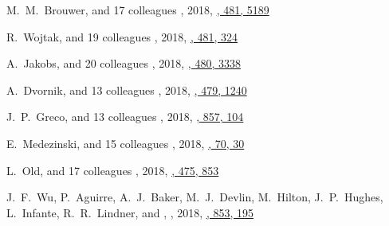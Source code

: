 \begin{etaremune}
\item
M.~M.~Brouwer, and 17 colleagues
,
2018, \href{https://ui.adsabs.harvard.edu/abs/2018MNRAS.481.5189B}{\mnras, 481, 5189}

\item
R.~Wojtak, and 19 colleagues
,
2018, \href{https://ui.adsabs.harvard.edu/abs/2018MNRAS.481..324W}{\mnras, 481, 324}

\item
A.~Jakobs, and 20 colleagues
,
2018, \href{https://ui.adsabs.harvard.edu/abs/2018MNRAS.480.3338J}{\mnras, 480, 3338}

\item
A.~Dvornik, and 13 colleagues
,
2018, \href{https://ui.adsabs.harvard.edu/abs/2018MNRAS.479.1240D}{\mnras, 479, 1240}

\item
J.~P.~Greco, and 13 colleagues
,
2018, \href{https://ui.adsabs.harvard.edu/abs/2018ApJ...857..104G}{\apj, 857, 104}

\item
E.~Medezinski, and 15 colleagues
,
2018, \href{https://ui.adsabs.harvard.edu/abs/2018PASJ...70...30M}{\pasj, 70, 30}

\item
L.~Old, and 17 colleagues
,
2018, \href{https://ui.adsabs.harvard.edu/abs/2018MNRAS.475..853O}{\mnras, 475, 853}

\item
J.~F.~Wu, P.~Aguirre, A.~J.~Baker, M.~J.~Devlin, M.~Hilton, J.~P.~Hughes, L.~Infante, R.~R.~Lindner, and \myself,
,
2018, \href{https://ui.adsabs.harvard.edu/abs/2018ApJ...853..195W}{\apj, 853, 195}


\end{etaremune}
